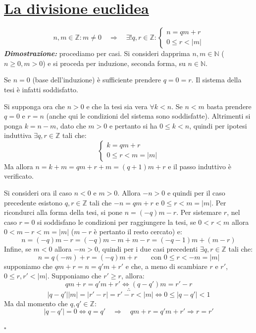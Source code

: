 \documentclass[oneside]{book}
\theoremstyle{remark}
\newcommand{\cvd}{\begin{flushright}$\square$\end{flushright}} %
\begin{document}
\section{\underline{La divisione euclidea}}
\begin{tcolorbox}[enhanced, breakable, title={Teorema della divisione euclidea}]
\[
    n,m \in \mathbb{Z}: m\not=0 \quad \Longrightarrow \quad \exists! q,r\in \mathbb{Z}:
    \begin{cases}
        n = qm + r\\
        0 \leq r < |m|
    \end{cases}
\]
\emph{\textbf{Dimostrazione:}}  procediamo
per casi. Si consideri dapprima $n,m \in \mathbb{N}$ ($n \geq 0, m > 0$)
e si proceda per induzione, seconda forma, su $n\in\mathbb{N}$.

Se $n = 0$ (base dell'induzione) è sufficiente prendere $q = 0 = r$. Il
sistema della tesi è infatti soddisfatto.

Si supponga ora che $n > 0$ e che la tesi sia vera $\forall k < n$.
Se $n < m$ basta prendere $q = 0$ e $r = n$ (anche qui le condizioni
del sistema sono soddisfatte). Altrimenti si ponga $k = n - m$, dato
che $m > 0$ e pertanto si ha $0 \leq k < n$,
quindi per ipotesi induttiva $\exists q,r \in \mathbb{Z}$ tali che:
\[ 
    \begin{cases}
        k = qm + r\\
        0 \leq r < m = |m|
    \end{cases}
\]
Ma allora $n = k + m = qm + r + m = (q+1)m + r$ e il passo induttivo
è verificato.

Si consideri ora il caso $n < 0$ e $m > 0$. Allora $-n > 0$ e quindi
per il caso precedente esistono $q,r \in \mathbb{Z}$ tali che
$-n = qm + r$ e $0 \leq r < m = |m|$. Per ricondurci alla forma della
tesi, si pone $n = (-q)m - r$. Per sistemare $r$, nel caso $r = 0$ si
soddisfano le condizioni per raggiungere la tesi, se $0 < r < m$ allora
$0 < m - r < m = |m|$ ($m - r$ è pertanto il resto cercato) e:
\[ n = (-q)m - r = (-q)m - m + m - r = (-q - 1)m + (m - r) \]
Infine, se $m < 0$ allora $-m > 0$, quindi per i due casi precedenti
$\exists q,r \in \mathbb{Z}$ tali che:
\[ n = q(-m) + r = (-q)m + r \qquad \text{con } 0 \leq r < -m = |m| \]
 supponiamo che
$qm + r = n = q'm + r'$ e che, a meno di scambiare $r$ e $r'$, $0 \leq r,r' < |m|$.
Supponiamo che $r' \geq r$, allora:
\[ qm + r = q'm + r' \Longleftrightarrow (q - q')m = r'-r \]
\[ \therefore \]
\[ |q-q'||m| = |r'-r| = r'-r < |m| \Longleftrightarrow 0 \leq |q-q'| < 1 \]
Ma dal momento che $q,q' \in \mathbb{Z}$:
\[
    |q-q'| = 0 \Longleftrightarrow q = q' \quad \Longrightarrow \quad qm + r = q'm + r' \Longrightarrow r = r'
\]

\cvd
\end{tcolorbox}
\end{document}
